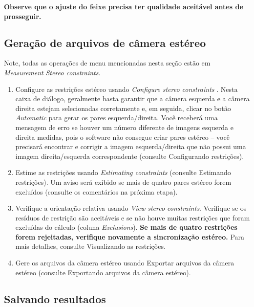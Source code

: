 \documentclass[
  12pt,
  letterpaper,
  DIV=11,
  numbers=noendperiod]{scrreprt}
\begin{document}
\textbf{Observe que o ajuste do feixe precisa ter qualidade aceitável
antes de prosseguir.}

\subsection{Geração de arquivos de câmera
estéreo}\label{gerauxe7uxe3o-de-arquivos-de-cuxe2mera-estuxe9reo}

Note, todas as operações de menu mencionadas nesta seção estão em
\emph{Measurement} \textbar{} \emph{Stereo constraints}.

\begin{enumerate}
\def\labelenumi{\arabic{enumi}.}
\item
  Configure as restrições estéreo usando \emph{Configure stereo
  constraints} . Nesta caixa de diálogo, geralmente basta garantir que a
  câmera esquerda e a câmera direita estejam selecionadas corretamente
  e, em seguida, clicar no botão \emph{Automatic} para gerar os pares
  esquerda/direita. Você receberá uma mensagem de erro se houver um
  número diferente de imagens esquerda e direita medidas, pois o
  software não consegue criar pares estéreo -- você precisará encontrar
  e corrigir a imagem esquerda/direita que não possui uma imagem
  direita/esquerda correspondente (consulte Configurando restrições).
\item
  Estime as restrições usando \emph{Estimating constraints} (consulte
  Estimando restrições). Um aviso será exibido se mais de quatro pares
  estéreo forem excluídos (consulte os comentários na próxima etapa).
\item
  Verifique a orientação relativa usando \emph{View stereo constraints}.
  Verifique se os resíduos de restrição são aceitáveis
  \hspace{0pt}\hspace{0pt}e se não houve muitas restrições que foram
  excluídas do cálculo (coluna \emph{Exclusions}). \textbf{Se mais de
  quatro restrições forem rejeitadas, verifique novamente a
  sincronização estéreo.} Para mais detalhes, consulte Visualizando as
  restrições.
\item
  Gere os arquivos da câmera estéreo usando Exportar arquivos da câmera
  estéreo (consulte Exportando arquivos da câmera estéreo).
\end{enumerate}

\subsection{Salvando resultados}\label{salvando-resultados}
\end{document}
